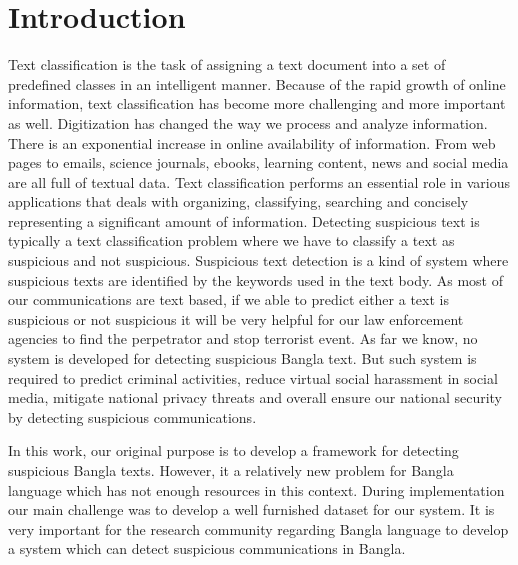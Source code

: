 \section{\textbf{Introduction}}
Text classification is the task of assigning a text document into a set of predefined classes in an intelligent manner. Because of the rapid growth of online information, text classification has become more challenging and more important as well. Digitization has changed
the way we process and analyze information. There is an exponential increase in online availability of information. From web pages to emails, science journals, ebooks, learning content, news and social media are all full of textual data. Text classification performs an essential role in various applications that deals with organizing, classifying, searching and concisely representing a significant amount of information. Detecting suspicious text is typically a text classification problem where we have to classify a text as suspicious and not suspicious. Suspicious text detection is a kind of system where suspicious texts are identified by the keywords used in the text body. As most of our communications are text based, if we able to predict either a text is suspicious or not suspicious it will be very helpful for our law enforcement agencies to find the perpetrator and stop terrorist event. As far we know, no system is developed for detecting suspicious Bangla text. But such system is required to predict criminal activities, reduce virtual social harassment in social media, mitigate national privacy threats and overall ensure our national security by detecting suspicious communications. 

In this work, our original purpose is to develop a framework for detecting suspicious Bangla texts. However, it a relatively new problem for Bangla language which has not enough resources in this context. During implementation our main challenge was to develop a well furnished dataset for our system. It is very important for the research community regarding Bangla language to develop a system which can detect suspicious communications in Bangla.